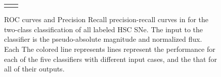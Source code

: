 \documentclass[proof]{pasj01}
\providecommand{\DIFadd}[1]{{\protect\color{blue} \sf #1}} %
\providecommand{\DIFdel}[1]{{\protect\color{red} \scriptsize #1}} %
\providecommand{\DIFaddFL}[1]{\DIFadd{#1}} %
\providecommand{\DIFdelFL}[1]{\DIFdel{#1}} %
\providecommand{\DIFaddbeginFL}{} %
\providecommand{\DIFaddendFL}{} %
\providecommand{\DIFdelbeginFL}{} %
\providecommand{\DIFdelendFL}{} %
\newcommand{\DIFscaledelfig}{0.5}
\newlength{\DIFdelgraphicswidth} %
\newlength{\DIFdelgraphicsheight} %
\newcommand{\DIFaddincludegraphics}[2][]{{\color{blue}\fbox{\DIFOincludegraphics[#1]{#2}}}} %
\newcommand{\DIFdelincludegraphics}[2][]{%
\sbox{\DIFdelgraphicsbox}{\DIFOincludegraphics[#1]{#2}}%
\settoboxwidth{\DIFdelgraphicswidth}{\DIFdelgraphicsbox} %
\settoboxtotalheight{\DIFdelgraphicsheight}{\DIFdelgraphicsbox} %
\scalebox{\DIFscaledelfig}{%
\parbox[b]{\DIFdelgraphicswidth}{\usebox{\DIFdelgraphicsbox}\\[-\baselineskip] \rule{\DIFdelgraphicswidth}{0em}}\llap{\resizebox{\DIFdelgraphicswidth}{\DIFdelgraphicsheight}{%
\setlength{\unitlength}{\DIFdelgraphicswidth}%
\begin{picture}(1,1)%
\thicklines\linethickness{2pt} %
{\color[rgb]{1,0,0}\put(0,0){\framebox(1,1){}}}%
{\color[rgb]{1,0,0}\put(0,0){\line( 1,1){1}}}%
{\color[rgb]{1,0,0}\put(0,1){\line(1,-1){1}}}%
\end{picture}%
}\hspace*{3pt}}} %
} %
\DeclareRobustCommand{\DIFaddbeginFL}{\DIFOaddbeginFL \let\includegraphics\DIFaddincludegraphics} %
\DeclareRobustCommand{\DIFaddendFL}{\DIFOaddendFL \let\includegraphics\DIFOincludegraphics} %
\DeclareRobustCommand{\DIFdelbeginFL}{\DIFOdelbeginFL \let\includegraphics\DIFdelincludegraphics} %
\DeclareRobustCommand{\DIFdelendFL}{\DIFOaddendFL \let\includegraphics\DIFOincludegraphics} %
\begin{document}
\begin{figure}[htbp]
\begin{tabular}{cc}
\begin{minipage}{0.5\hsize}
\begin{center}
            \end{center}
        \end{minipage}
    \end{tabular}
    \vspace{2mm}
    \caption{%
    ROC curves and \DIFdelbeginFL \DIFdelFL{Precision Recall }\DIFdelendFL \DIFaddbeginFL \DIFaddFL{precision-recall }\DIFaddendFL curves \DIFdelbeginFL \DIFdelFL{in }\DIFdelendFL \DIFaddbeginFL \DIFaddFL{for the }\DIFaddendFL two-class classification of all labeled HSC SNe.
    The input to the classifier is \DIFaddbeginFL \DIFaddFL{the }\DIFaddendFL pseudo-absolute magnitude and normalized flux.
    \DIFdelbeginFL \DIFdelFL{Each }\DIFdelendFL \DIFaddbeginFL \DIFaddFL{The }\DIFaddendFL colored \DIFdelbeginFL \DIFdelFL{line represents }\DIFdelendFL \DIFaddbeginFL \DIFaddFL{lines represent }\DIFaddendFL the performance for each of the five classifiers with different input cases, and \DIFdelbeginFL \DIFdelFL{the }\DIFdelendFL that for all of their outputs.
    }
    \label{fig:h2_test_all}
\end{figure}
%
%
%
\end{document}

